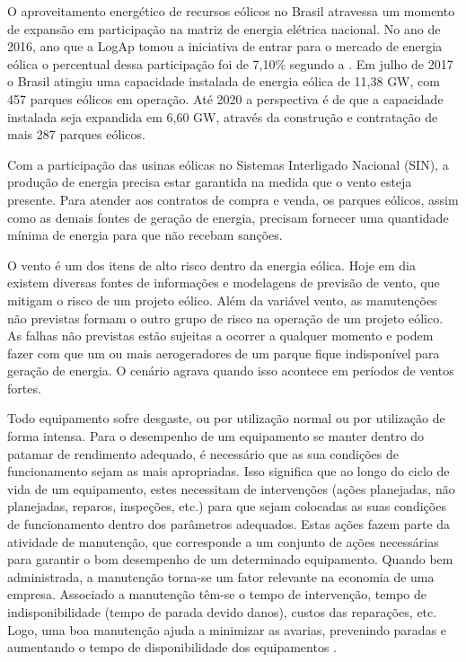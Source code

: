 O aproveitamento energético de recursos eólicos no Brasil atravessa um momento de expansão em participação na matriz de energia elétrica nacional. No ano de 2016, ano que a LogAp tomou a iniciativa de entrar para o mercado de energia eólica o percentual dessa participação foi de 7,10\% segundo a  . Em julho de 2017 o Brasil atingiu uma capacidade instalada de energia eólica de 11,38 GW, com 457 parques eólicos em operação. Até 2020 a perspectiva é de que a capacidade instalada seja expandida em 6,60 GW, através da construção e contratação de mais 287 parques eólicos.

Com a participação das usinas eólicas no Sistemas Interligado Nacional (SIN), a produção de energia precisa estar garantida na medida que o vento esteja presente. Para atender aos contratos de compra e venda, os parques eólicos, assim como as demais fontes de geração de energia, precisam fornecer uma quantidade mínima de energia para que não recebam sanções. 

O vento é um dos itens de alto risco dentro da energia eólica. Hoje em dia existem diversas fontes de informações e modelagens de previsão de vento, que mitigam o risco de um projeto eólico. Além da variável vento, as manutenções não previstas formam o outro grupo de risco na operação de um projeto eólico. As falhas não previstas estão sujeitas a ocorrer a qualquer momento e podem fazer com que um ou mais aerogeradores de um parque fique indisponível para geração de energia. O cenário agrava quando isso acontece em períodos de ventos fortes.

Todo equipamento sofre desgaste, ou por utilização normal ou por utilização de forma intensa. Para o desempenho de um equipamento se manter dentro do patamar de rendimento adequado, é necessário que as sua condições de funcionamento sejam as mais apropriadas. Isso significa que ao longo do ciclo de vida de um equipamento, estes necessitam de intervenções (ações planejadas, não planejadas, reparos, inspeções, etc.) para que sejam colocadas as suas condições de funcionamento dentro dos parâmetros adequados. Estas ações fazem parte da atividade de manutenção, que corresponde a um conjunto de ações necessárias para garantir o bom desempenho de um determinado equipamento. Quando bem administrada, a manutenção torna-se um fator relevante na economia de uma empresa. Associado a manutenção têm-se o tempo de intervenção, tempo de indisponibilidade (tempo de parada devido danos), custos das reparações, etc. Logo, uma boa manutenção ajuda a minimizar as avarias, prevenindo paradas e aumentando o tempo de disponibilidade dos equipamentos \cite{manutencao-sistemas-geracao-energia-renovavel}.

